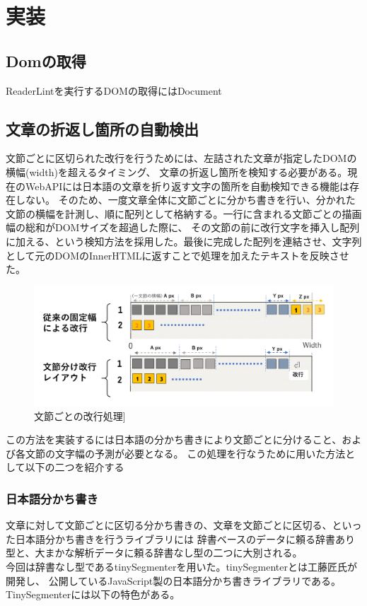\section{実装}


\subsection{Domの取得}
ReaderLintを実行するDOMの取得にはDocument


\subsection{文章の折返し箇所の自動検出}
文節ごとに区切られた改行を行うためには、左詰された文章が指定したDOMの横幅(width)を超えるタイミング、
文章の折返し箇所を検知する必要がある。現在のWebAPIには日本語の文章を折り返す文字の箇所を自動検知できる機能は存在しない。
そのため、一度文章全体に文節ごとに分かち書きを行い、分かれた文節の横幅を計測し、順に配列として格納する。一行に含まれる文節ごとの描画幅の総和がDOMサイズを超過した際に、
その文節の前に改行文字を挿入し配列に加える、という検知方法を採用した。最後に完成した配列を連結させ、文字列として元のDOMのInnerHTMLに返すことで処理を加えたテキストを反映させた。

\begin{figure}[H]
    \centering
    \label{fig:image14}
    \includegraphics[width=0.8\columnwidth]{image/03/img6.png}
	\caption[文節ごとの改行処理]{文節ごとの改行処理]}
\end{figure}

この方法を実装するには日本語の分かち書きにより文節ごとに分けること、および各文節の文字幅の予測が必要となる。
この処理を行なうために用いた方法として以下の二つを紹介する

\subsubsection{日本語分かち書き}
文章に対して文節ごとに区切る分かち書きの、文章を文節ごとに区切る、といった日本語分かち書きを行うライブラリには
辞書ベースのデータに頼る辞書あり型と、大まかな解析データに頼る辞書なし型の二つに大別される。
\\今回は辞書なし型であるtinySegmenterを用いた。tinySegmenterとは工藤匠氏が開発し、
公開しているJavaScript製の日本語分かち書きライブラリである。\footnotemark[2]
TinySegmenterには以下の特色がある。

